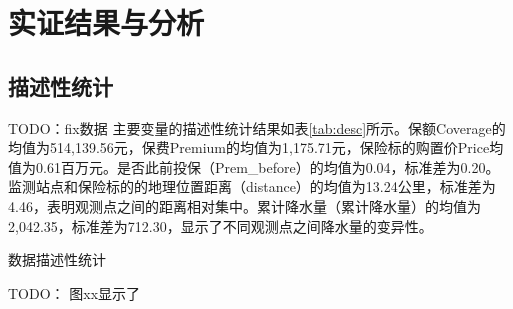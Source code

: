 \chapter{实证结果与分析}\label{chap:4}
\section{描述性统计}
TODO：fix数据
主要变量的描述性统计结果如表\ref{tab:desc}所示。保额Coverage的均值为514,139.56元，保费Premium的均值为1,175.71元，保险标的购置价Price均值为0.61百万元。是否此前投保（Prem\_before）的均值为0.04，标准差为0.20。监测站点和保险标的的地理位置距离（distance）的均值为13.24公里，标准差为4.46，表明观测点之间的距离相对集中。累计降水量（累计降水量）的均值为2,042.35，标准差为712.30，显示了不同观测点之间降水量的变异性。

\begin{table}[H]
    \caption{数据描述性统计}\label{tab:desc}
    \centering
    
\end{table}

TODO：
图xx显示了

